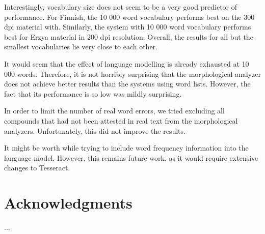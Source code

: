 \documentclass[b5paper]{article}
\begin{document}
Interestingly, vocabulary size does not seem to be a very good
predictor of performance. For Finnish, the 10 000 word vocabulary
performs best on the 300 dpi material with. Similarly, the system with
10 000 word vocabulary performs best for Erzya material in 200 dpi
resolution. Overall, the results for all but the smallest vocabularies
lie very close to each other.

It would seem that the effect of language modelling is already
exhausted at 10 000 words. Therefore, it is not horribly surprising
that the morphological analyzer does not achieve better results than
the systems using word lists. However, the fact that its performance
is so low was mildly surprising.

In order to limit the number of real word errors, we tried excluding
all compounds that had not been attested in real text from the
morphological analyzers. Unfortunately, this did not improve the
results.

It might be worth while trying to include word frequency information into
the language model. However, this remains future work, as it would
require extensive changes to Tesseract.

\section*{Acknowledgments}

...



\end{document}
